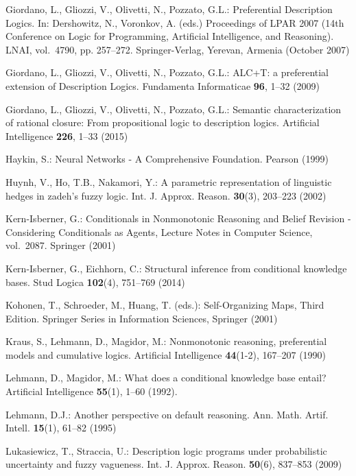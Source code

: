 \documentclass[runningheads]{llncs}
\begin{document}
\begin{thebibliography}{10}
Giordano, L., Gliozzi, V., Olivetti, N., Pozzato, G.L.: {P}referential
  {D}escription {L}ogics. In: Dershowitz, N., Voronkov, A. (eds.) Proceedings
  of LPAR 2007 (14th Conference on Logic for Programming, Artificial
  Intelligence, and Reasoning). LNAI, vol.~4790, pp. 257--272. Springer-Verlag,
  Yerevan, Armenia (October 2007)

Giordano, L., Gliozzi, V., Olivetti, N., Pozzato, G.L.: {ALC+T}: a preferential
  extension of {D}escription {L}ogics. Fundamenta Informaticae  \textbf{96},
  1--32 (2009)

Giordano, L., Gliozzi, V., Olivetti, N., Pozzato, G.L.: {Semantic
  characterization of rational closure: From propositional logic to description
  logics}. Artificial Intelligence  \textbf{226},  1--33 (2015)

Haykin, S.: Neural Networks - A Comprehensive Foundation. Pearson (1999)

Huynh, V., Ho, T.B., Nakamori, Y.: A parametric representation of linguistic
  hedges in zadeh's fuzzy logic. Int. J. Approx. Reason.  \textbf{30}(3),
  203--223 (2002)

Kern{-}Isberner, G.: Conditionals in Nonmonotonic Reasoning and Belief Revision
  - Considering Conditionals as Agents, Lecture Notes in Computer Science,
  vol.~2087. Springer (2001)

Kern{-}Isberner, G., Eichhorn, C.: Structural inference from conditional
  knowledge bases. Stud Logica  \textbf{102}(4),  751--769 (2014)

Kohonen, T., Schroeder, M., Huang, T. (eds.): Self-Organizing Maps, Third
  Edition. Springer Series in Information Sciences, Springer (2001)

Kraus, S., Lehmann, D., Magidor, M.: Nonmonotonic reasoning, preferential
  models and cumulative logics. Artificial Intelligence  \textbf{44}(1-2),
  167--207 (1990)

Lehmann, D., Magidor, M.: What does a conditional knowledge base entail?
  Artificial Intelligence  \textbf{55}(1),  1--60 (1992).

Lehmann, D.J.: Another perspective on default reasoning. Ann. Math. Artif.
  Intell.  \textbf{15}(1),  61--82 (1995)

Lukasiewicz, T., Straccia, U.: Description logic programs under probabilistic
  uncertainty and fuzzy vagueness. Int. J. Approx. Reason.  \textbf{50}(6),
  837--853 (2009)


\end{thebibliography}
\end{document}
